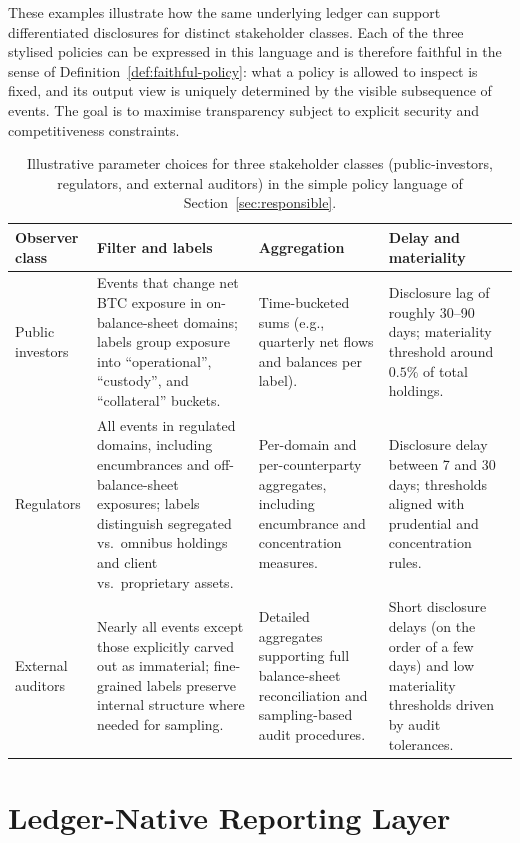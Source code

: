 \documentclass[11pt]{article}
\begin{document}
These examples illustrate how the same underlying ledger can support differentiated disclosures for distinct stakeholder classes.
Each of the three stylised policies can be expressed in this language and is therefore faithful in the sense of Definition~\ref{def:faithful-policy}: what a policy is allowed to inspect is fixed, and its output view is uniquely determined by the visible subsequence of events.
The goal is to maximise transparency subject to explicit security and competitiveness constraints.
\begin{table}[H]
  \centering
  \small
  \begin{tabularx}{\textwidth}{@{}p{2.7cm}X X X@{}}
    \toprule
    Observer class & Filter and labels & Aggregation & Delay and materiality \\
    \midrule
    Public investors &
    Events that change net BTC exposure in on-balance-sheet domains; labels group exposure into ``operational'', ``custody'', and ``collateral'' buckets. &
    Time-bucketed sums (e.g., quarterly net flows and balances per label). &
    Disclosure lag of roughly 30--90 days; materiality threshold around $0.5\%$ of total holdings. \\
    Regulators &
    All events in regulated domains, including encumbrances and off-balance-sheet exposures; labels distinguish segregated vs.\ omnibus holdings and client vs.\ proprietary assets. &
    Per-domain and per-counterparty aggregates, including encumbrance and concentration measures. &
    Disclosure delay between 7 and 30 days; thresholds aligned with prudential and concentration rules. \\
    External auditors &
    Nearly all events except those explicitly carved out as immaterial; fine-grained labels preserve internal structure where needed for sampling. &
    Detailed aggregates supporting full balance-sheet reconciliation and sampling-based audit procedures. &
    Short disclosure delays (on the order of a few days) and low materiality thresholds driven by audit tolerances. \\
    \bottomrule
  \end{tabularx}
  \caption{Illustrative parameter choices for three stakeholder classes (public-investors, regulators, and external auditors) in the simple policy language of Section~\ref{sec:responsible}.}
  \label{tab:example-policies}
\end{table}

\section{Ledger-Native Reporting Layer}
\label{sec:reporting}
\end{document}
